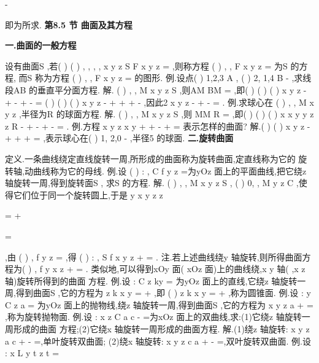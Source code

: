 -




即为所求. 
\vspace{6pt}
{\large \bfseries \textcolor{lyred}{第8.5 节 曲面及其方程}}

\vspace{4pt}
{\bfseries \textcolor{lyred}{一.曲面的一般方程}}

设有曲面S ,若(
)
(
)
, ,
, ,
x y z
S
F x y z
\in 
\Leftrightarrow 
=
,则称方程
(
)
, ,
F x y z =
为S 的\textcolor{lyred}{方程}, 
而S 称为方程
(
)
, ,
F x y z =
的\textcolor{lyred}{图形}. 
\textcolor{lyred}{例}.设点(
)
1,2,3
A
, (
)
2, 1,4
B
-
,求线段AB 的垂直平分面方程. 
解.
(
)
, ,
M x y z
S
\forall 
\in 
,则AM
BM
=
,即(
)
(
)
(
)
x
y
z
-
+
-
+
-
= 
(
)
(
)
(
)
x
y
z
-
+
+
+
-
,因此2
x
y
z
-
+
-
=
. 
\textcolor{lyred}{例}.求球心在
(
)
,
,
M
x
y z
,半径为R 的球面方程. 
解.
(
)
, ,
M x y z
S
\forall 
\in 
,则
MM
R
=
,即(
)
(
)
(
)
x
x
y
y
z
z
R
-
+
-
+
-
=
. 
\textcolor{lyred}{例}.方程
x
y
z
x
y
+
+
-
+
=
表示怎样的曲面? 
解.(
)
(
)
x
y
z
-
+
+
+
=
,表示球心在(
)
1, 2,0
-
,半径5 的球面. 
\vspace{4pt}
{\bfseries \textcolor{lyred}{二.旋转曲面}}

\textcolor{lyred}{定义}.一条曲线绕定直线旋转一周,所形成的曲面称为\textcolor{lyred}{旋转曲面},定直线称为它的 
\textcolor{lyred}{旋转轴},动曲线称为它的\textcolor{lyred}{母线}. 
\textcolor{lyred}{例}.设
(
)
:
,
C f y z =为yOz 面上的平面曲线,把它绕z 轴旋转一周,得到旋转面S , 
求S 的方程. 
解.
(
)
, ,
M x y z
S
\forall 
\in 
,
(
)
0,
,
M
y z
C
\exists 
\in 
,使得它们位于同一个旋转圆上,于是 
y
x
y
z
z

=
+

=

,由
(
)
,
f
y z
=
,得
(
)
:
,
S
f
x
y
z
\pm 
+
=
. 
\textcolor{lyred}{注}.若上述曲线绕y 轴旋转,则所得曲面方程为(
)
,
f
y
x
z
\pm 
+
=
. 
类似地,可以得到xOy 面( xOz 面)上的曲线绕,x y 轴( ,x z 轴)旋转所得到的曲面 
方程. 
\textcolor{lyred}{例}.设
:
C z
ky
=
为yOz 面上的直线,它绕z 轴旋转一周,得到曲面S ,它的方程为 
z
k
x
y
=\pm 
+
,即
(
)
z
k
x
y
=
+
,称为\textcolor{lyred}{圆锥面}. 
\textcolor{lyred}{例}.设
:
y
C z
a
=
为yOz 面上的抛物线,绕z 轴旋转一周,得到曲面S ,它的方程为 
x
y
z
a
+
=
,称为\textcolor{lyred}{旋转抛物面}. 
\textcolor{lyred}{例}.设
:
x
z
C a
c
-
=为xOz 面上的双曲线,求:(1)它绕z 轴旋转一周形成的曲面 
方程;(2)它绕x 轴旋转一周形成的曲面方程. 
解.(1)绕z 轴旋转:
x
y
z
a
c
+
-
=,\textcolor{lyred}{单叶旋转双曲面}; 
(2)绕x 轴旋转:
x
y
z
c
a
+
-
=,\textcolor{lyred}{双叶旋转双曲面}. 
\textcolor{lyred}{例}.设
:
x
L
y
t
z
t
=


